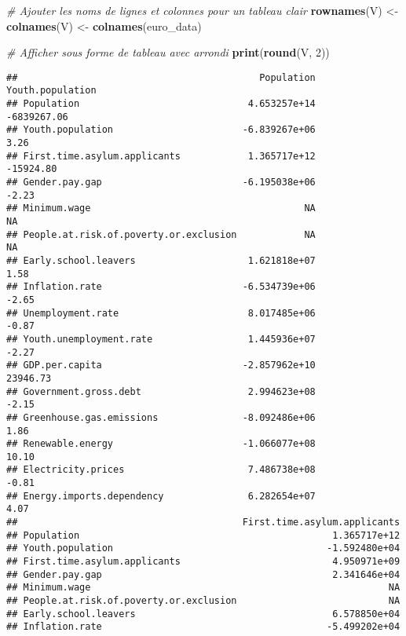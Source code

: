 \documentclass[
]{article}
\newenvironment{Shaded}{\begin{snugshade}}{\end{snugshade}}
\newcommand{\CommentTok}[1]{\textcolor[rgb]{0.56,0.35,0.01}{\textit{#1}}}
\newcommand{\DecValTok}[1]{\textcolor[rgb]{0.00,0.00,0.81}{#1}}
\newcommand{\FunctionTok}[1]{\textcolor[rgb]{0.13,0.29,0.53}{\textbf{#1}}}
\newcommand{\NormalTok}[1]{#1}
\newcommand{\OtherTok}[1]{\textcolor[rgb]{0.56,0.35,0.01}{#1}}
\begin{document}
\begin{Shaded}
\begin{Highlighting}[]
\CommentTok{\# Ajouter les noms de lignes et colonnes pour un tableau clair}
\FunctionTok{rownames}\NormalTok{(V) }\OtherTok{\textless{}{-}} \FunctionTok{colnames}\NormalTok{(V) }\OtherTok{\textless{}{-}} \FunctionTok{colnames}\NormalTok{(euro\_data)}

\CommentTok{\# Afficher sous forme de tableau avec arrondi}
\FunctionTok{print}\NormalTok{(}\FunctionTok{round}\NormalTok{(V, }\DecValTok{2}\NormalTok{))}
\end{Highlighting}
\end{Shaded}

\begin{verbatim}
##                                           Population Youth.population
## Population                              4.653257e+14      -6839267.06
## Youth.population                       -6.839267e+06             3.26
## First.time.asylum.applicants            1.365717e+12        -15924.80
## Gender.pay.gap                         -6.195038e+06            -2.23
## Minimum.wage                                      NA               NA
## People.at.risk.of.poverty.or.exclusion            NA               NA
## Early.school.leavers                    1.621818e+07             1.58
## Inflation.rate                         -6.534739e+06            -2.65
## Unemployment.rate                       8.017485e+06            -0.87
## Youth.unemployment.rate                 1.445936e+07            -2.27
## GDP.per.capita                         -2.857962e+10         23946.73
## Government.gross.debt                   2.994623e+08            -2.15
## Greenhouse.gas.emissions               -8.092486e+06             1.86
## Renewable.energy                       -1.066077e+08            10.10
## Electricity.prices                      7.486738e+08            -0.81
## Energy.imports.dependency               6.282654e+07             4.07
##                                        First.time.asylum.applicants
## Population                                             1.365717e+12
## Youth.population                                      -1.592480e+04
## First.time.asylum.applicants                           4.950971e+09
## Gender.pay.gap                                         2.341646e+04
## Minimum.wage                                                     NA
## People.at.risk.of.poverty.or.exclusion                           NA
## Early.school.leavers                                   6.578850e+04
## Inflation.rate                                        -5.499202e+04

\end{verbatim}
\end{document}
